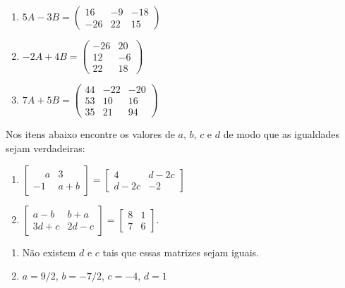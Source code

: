 \documentclass[12pt]{exam}
\begin{document}
\begin{exercicio}
\begin{solucao}
\begin{enumerate}[label={\alph*})]
            \item $5A - 3B = \begin{pmatrix}16 & -9 & -18\\-26 & 22 & 15\end{pmatrix}$
            \item $-2A + 4B = \begin{pmatrix}-26 & 20\\12 & -6\\22 & 18\end{pmatrix}$
            \item $7A + 5B = \begin{pmatrix}44 & -22 & -20\\53 & 10 & 16\\35 & 21 & 94\end{pmatrix}$
        \end{enumerate}
    \end{solucao}
\end{exercicio}

\begin{exercicio}
    \label{igualdade_de_matrizes} Nos itens abaixo encontre os valores de $a$, $b$, $c$ e $d$ de modo que as igualdades sejam verdadeiras:
    \begin{enumerate}[label={\alph*})]
        \item $\begin{bmatrix}\phantom{-} a & 3\\-1 & a + b\end{bmatrix} = \begin{bmatrix}4 & d - 2c\\d - 2c & -2\end{bmatrix}$
        \item $\begin{bmatrix}a - b & b + a\\3d + c & 2d - c\end{bmatrix} = \begin{bmatrix}8 & 1\\7 & 6\end{bmatrix}$.
    \end{enumerate}
    \begin{solucao}
        \begin{enumerate}
            \item Não existem $d$ e $c$ tais que essas matrizes sejam iguais.
            \item $a = 9/2$, $b = -7/2$, $c = -4$, $d = 1$
        \end{enumerate}
    \end{solucao}
\end{exercicio}
\end{document}
